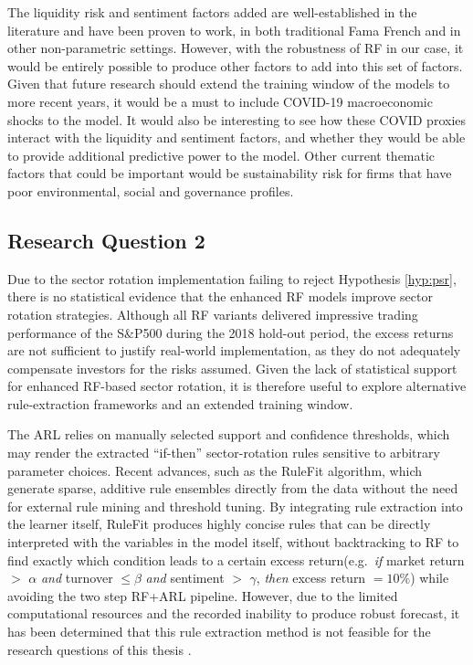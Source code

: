The liquidity risk and sentiment factors added are well-established in the literature and have been proven to work, in both traditional Fama French and in other non-parametric settings. However, with the robustness of RF in our case, it would be entirely possible to produce other factors to add into this set of factors. Given that future research should extend the training window of the models to more recent years, it would be a must to include COVID-19 macroeconomic shocks to the model. It would also be interesting to see how these COVID proxies interact with the liquidity and sentiment factors, and whether they would be able to provide additional predictive power to the model. Other current thematic factors that could be important would be sustainability risk for firms that have poor environmental, social and governance profiles.


\subsection{Research Question 2}

Due to the sector rotation implementation failing to reject Hypothesis \ref{hyp:psr}, there is no statistical evidence that the enhanced RF models improve sector rotation strategies. Although all RF variants delivered impressive trading performance of the S\&P500 during the 2018 hold-out period, the excess returns are not sufficient to justify real-world implementation, as they do not adequately compensate investors for the risks assumed. Given the lack of statistical support for enhanced RF-based sector rotation, it is therefore useful to explore alternative rule-extraction frameworks and an extended training window.


The ARL relies on manually selected support and confidence thresholds, which may render the extracted “if-then” sector-rotation rules sensitive to arbitrary parameter choices. Recent advances, such as the RuleFit algorithm, which generate sparse, additive rule ensembles directly from the data without the need for external rule mining and threshold tuning. By integrating rule extraction into the learner itself, RuleFit produces highly concise rules that can be directly interpreted with the variables in the model itself, without backtracking to RF to find exactly which condition leads to a certain excess return(e.g.\ \emph{if} market return $>$ $\alpha$ \emph{and} turnover $\le \beta$ \emph{and} sentiment $>$ $\gamma$, \emph{then} excess return $=10\%$) while avoiding the two step RF+ARL pipeline. However, due to the limited computational resources and the recorded inability to produce robust forecast, it has been determined that this rule extraction method is not feasible for the research questions of this thesis \cite{molnar_2019}. 

